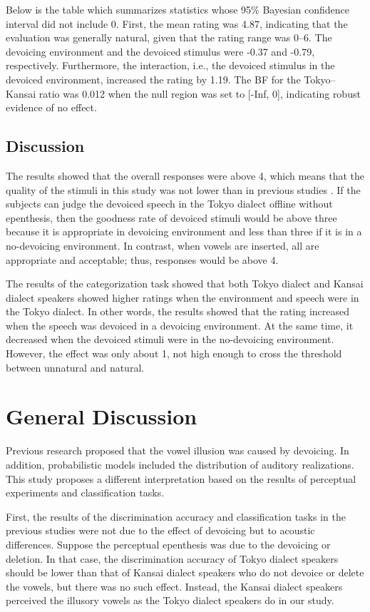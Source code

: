 \documentclass[a4paper,11pt,twocolumn]{article}
\begin{document}
Below is the table which summarizes statistics whose 95\% Bayesian confidence interval did not include 0. First, the mean rating was 4.87, indicating that the evaluation was generally natural, given that the rating range was 0--6. The devoicing environment and the devoiced stimulus were -0.37 and -0.79, respectively. Furthermore, the interaction, i.e., the devoiced stimulus in the devoiced environment, increased the rating by 1.19. The BF for the Tokyo--Kansai ratio was 0.012 when the null region was set to [-Inf, 0], indicating robust evidence of no effect.

\subsection{Discussion}

The results showed that the overall responses were above 4, which means that the quality of the stimuli in this study was not lower than in previous studies \cite{kilpatrick2018japanese}. If the subjects can judge the devoiced speech in the Tokyo dialect offline without epenthesis, then the goodness rate of devoiced stimuli would be above three because it is appropriate in devoicing environment and less than three if it is in a no-devoicing environment. In contrast, when vowels are inserted, all are appropriate and acceptable; thus, responses would be above 4.

The results of the categorization task showed that both Tokyo dialect and Kansai dialect speakers showed higher ratings when the environment and speech were in the Tokyo dialect. In other words, the results showed that the rating increased when the speech was devoiced in a devoicing environment. At the same time, it decreased when the devoiced stimuli were in the no-devoicing environment. However, the effect was only about 1, not high enough to cross the threshold between unnatural and natural.

\section{General Discussion}

Previous research proposed that the vowel illusion was caused by devoicing. In addition, probabilistic models included the distribution of auditory realizations. This study proposes a different interpretation based on the results of perceptual experiments and classification tasks.

First, the results of the discrimination accuracy and classification tasks in the previous studies were not due to the effect of devoicing but to acoustic differences. Suppose the perceptual epenthesis was due to the devoicing or deletion. In that case, the discrimination accuracy of Tokyo dialect speakers should be lower than that of Kansai dialect speakers who do not devoice or delete the vowels, but there was no such effect. Instead, the Kansai dialect speakers perceived the illusory vowels as the Tokyo dialect speakers do in our study.
\end{document}
